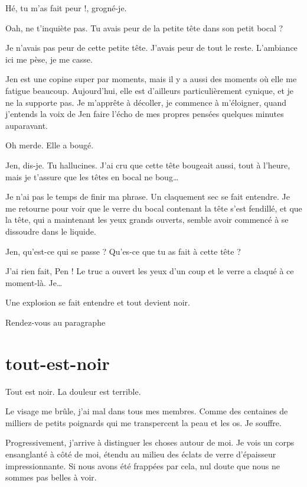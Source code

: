 \item Hé, tu m'as fait peur !, grogné-je.
\item Oah, ne t'inquiète pas. Tu avais peur de la petite tête dans son petit bocal ?
\item Je n'avais pas peur de cette petite tête. J'avais peur de tout le reste. L'ambiance ici me pèse, je me casse.

Jen est une copine super par moments, mais il y a aussi des moments où elle me fatigue beaucoup. Aujourd'hui, elle est d'ailleurs particulièrement cynique, et je ne la supporte pas. Je m'apprête à décoller, je commence à m'éloigner, quand j'entends la voix de Jen faire l'écho de mes propres pensées quelques minutes auparavant.
 
\item Oh merde. Elle a bougé.
\item Jen, dis-je. Tu hallucines. J'ai cru que cette tête bougeait aussi, tout à l'heure, mais je t'assure que les têtes en bocal ne boug…

Je n'ai pas le temps de finir ma phrase. Un claquement sec se fait entendre. Je me retourne pour voir que le verre du bocal contenant la tête s'est fendillé, et que la tête, qui a maintenant les yeux grands ouverts, semble avoir commencé à se dissoudre dans le liquide.

\item Jen, qu'est-ce qui se passe ? Qu'es-ce que tu as fait à cette tête ?
\item J'ai rien fait, Pen ! Le truc a ouvert les yeux d'un coup et le verre a claqué à ce moment-là. Je…

Une explosion se fait entendre et tout devient noir.

\item Rendez-vous au paragraphe 
\enw

\section{tout-est-noir}

Tout est noir. La douleur est terrible.

Le visage me brûle, j'ai mal dans tous mes membres. Comme des centaines de milliers de petits poignards qui me transpercent la peau et les os. Je souffre.

Progressivement, j'arrive à distinguer les choses autour de moi. Je vois un corps ensanglanté à côté de moi, étendu au milieu des éclats de verre d'épaisseur impressionnante. Si nous avons été frappées par cela, nul doute que nous ne sommes pas belles à voir.

